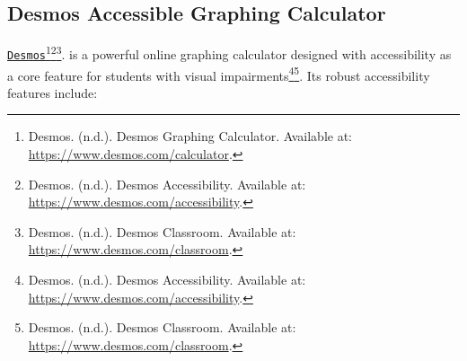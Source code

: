 \subsection{Desmos Accessible Graphing Calculator}
\href{https://www.desmos.com/}{\texttt{Desmos}}\footnote{Desmos. (n.d.). Desmos Graphing Calculator. Available at: \url{https://www.desmos.com/calculator}.}\footnote{Desmos. (n.d.). Desmos Accessibility. Available at: \url{https://www.desmos.com/accessibility}.}\footnote{Desmos. (n.d.). Desmos Classroom. Available at: \url{https://www.desmos.com/classroom}.}. is a powerful online graphing calculator designed with accessibility as a core feature for students with visual impairments\footnote{Desmos. (n.d.). Desmos Accessibility. Available at: \url{https://www.desmos.com/accessibility}.}\footnote{Desmos. (n.d.). Desmos Classroom. Available at: \url{https://www.desmos.com/classroom}.}. Its robust accessibility features include:
